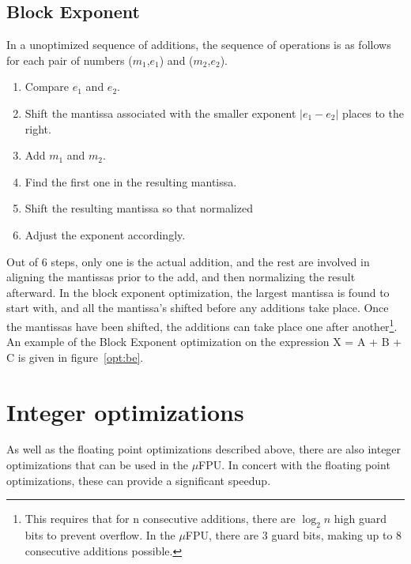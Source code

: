 \subsection{Block Exponent}

In a unoptimized sequence of additions, the sequence of operations is as
follows for each pair of numbers ($m_1$,$e_1$) and ($m_2$,$e_2$).
\begin{enumerate}
  \item Compare $e_1$ and $e_2$.
  \item Shift the mantissa associated with the smaller exponent $|e_1-e_2|$
        places to the right.
  \item Add $m_1$ and $m_2$.
  \item Find the first one in the resulting mantissa.
  \item Shift the resulting mantissa so that normalized
  \item Adjust the exponent accordingly.
\end{enumerate}

Out of 6 steps, only one is the actual addition, and the rest are involved
in aligning the mantissas prior to the add, and then normalizing the result
afterward.  In the block exponent optimization, the largest mantissa is
found to start with, and all the mantissa's shifted before any additions
take place.  Once the mantissas have been shifted, the additions can take
place one after another\footnote{This requires that for n consecutive
additions, there are $\log_{2}n$ high guard bits to prevent overflow.  In
the $\mu$FPU, there are 3 guard bits, making up to 8 consecutive additions
possible.}.  An example of the Block Exponent optimization on the expression
X = A + B + C is given in figure~\ref{opt:be}.

%

\section{Integer optimizations}

As well as the floating point optimizations described above, there are
also integer optimizations that can be used in the $\mu$FPU.  In concert
with the floating point optimizations, these can provide a significant
speedup.  

